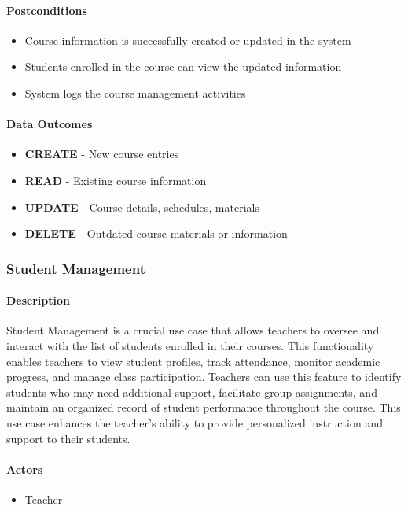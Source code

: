 \paragraph{Postconditions}
\begin{itemize}
    \item Course information is successfully created or updated in the system
    \item Students enrolled in the course can view the updated information
    \item System logs the course management activities
\end{itemize}

\paragraph{Data Outcomes}
\begin{itemize}
    \item \textbf{CREATE} - New course entries
    \item \textbf{READ} - Existing course information
    \item \textbf{UPDATE} - Course details, schedules, materials
    \item \textbf{DELETE} - Outdated course materials or information
\end{itemize}

\subsubsection{Student Management}

\paragraph{Description}
Student Management is a crucial use case that allows teachers to oversee and interact with the list of students enrolled in their courses. This functionality enables teachers to view student profiles, track attendance, monitor academic progress, and manage class participation. Teachers can use this feature to identify students who may need additional support, facilitate group assignments, and maintain an organized record of student performance throughout the course. This use case enhances the teacher's ability to provide personalized instruction and support to their students.

\paragraph{Actors}
\begin{itemize}
    \item Teacher
\end{itemize}

